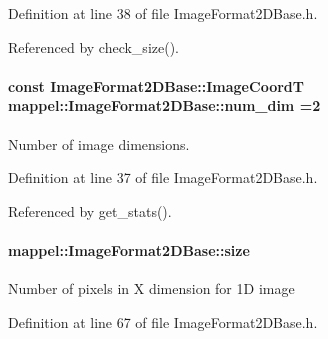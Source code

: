 Definition at line 38 of file Image\+Format2\+D\+Base.\+h.



Referenced by check\+\_\+size().

\paragraph[{\texorpdfstring{num\+\_\+dim}{num_dim}}]{\setlength{\rightskip}{0pt plus 5cm}const {\bf Image\+Format2\+D\+Base\+::\+Image\+CoordT} mappel\+::\+Image\+Format2\+D\+Base\+::num\+\_\+dim =2\hspace{0.3cm}{\ttfamily [static]}}\hypertarget{classmappel_1_1ImageFormat2DBase_a9c29fcaf30faffc77b41ba556ebb0127}{}\label{classmappel_1_1ImageFormat2DBase_a9c29fcaf30faffc77b41ba556ebb0127}
Number of image dimensions. 

Definition at line 37 of file Image\+Format2\+D\+Base.\+h.



Referenced by get\+\_\+stats().

\paragraph[{\texorpdfstring{size}{size}}]{ mappel\+::\+Image\+Format2\+D\+Base\+::size\hspace{0.3cm}{\ttfamily [protected]}}\hypertarget{classmappel_1_1ImageFormat2DBase_a3be77d2aa6ec9f3815322732950c2a60}{}\label{classmappel_1_1ImageFormat2DBase_a3be77d2aa6ec9f3815322732950c2a60}
Number of pixels in X dimension for 1D image 

Definition at line 67 of file Image\+Format2\+D\+Base.\+h.



